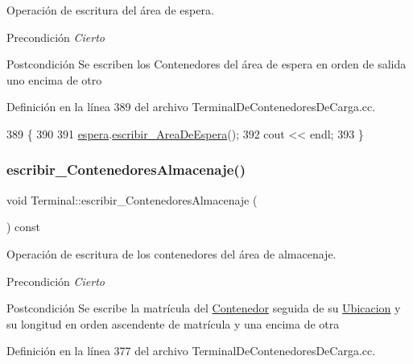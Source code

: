 Operación de escritura del área de espera. 

\begin{DoxyPrecond}{Precondición}
{\itshape Cierto} 
\end{DoxyPrecond}
\begin{DoxyPostcond}{Postcondición}
Se escriben los Contenedores del área de espera en orden de salida uno encima de otro 
\end{DoxyPostcond}


Definición en la línea 389 del archivo Terminal\+De\+Contenedores\+De\+Carga.\+cc.


\begin{DoxyCode}
389                                            \{
390     
391     \hyperlink{class_terminal_ac9f71207d73c8d05a9d9d6c046f9f8c3}{espera}.\hyperlink{class_espera_aacb008e5be8ecd85fbba9cdef8b8be33}{escribir\_AreaDeEspera}();
392     cout << endl;
393 \}
\end{DoxyCode}
\mbox{\label{class_terminal_a24c74e2dd8c8e41452a7e890bc925f0e}} 
\subsubsection{\texorpdfstring{escribir\+\_\+\+Contenedores\+Almacenaje()}{escribir\_ContenedoresAlmacenaje()}}
{\footnotesize\ttfamily void Terminal\+::escribir\+\_\+\+Contenedores\+Almacenaje (\begin{DoxyParamCaption}{ }\end{DoxyParamCaption}) const}



Operación de escritura de los contenedores del área de almacenaje. 

\begin{DoxyPrecond}{Precondición}
{\itshape Cierto} 
\end{DoxyPrecond}
\begin{DoxyPostcond}{Postcondición}
Se escribe la matrícula del \hyperlink{class_contenedor}{Contenedor} seguida de su \hyperlink{class_ubicacion}{Ubicacion} y su longitud en orden ascendente de matrícula y una encima de otra 
\end{DoxyPostcond}


Definición en la línea 377 del archivo Terminal\+De\+Contenedores\+De\+Carga.\+cc.


